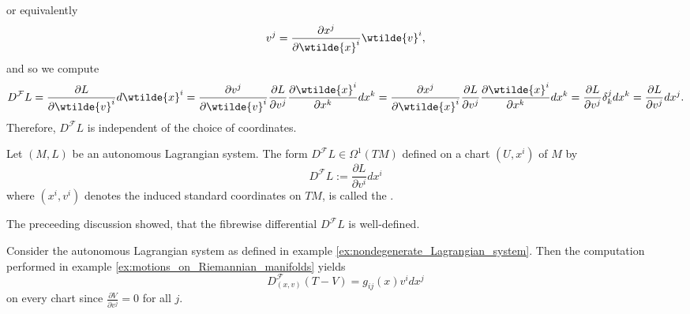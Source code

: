 \noindent or equivalently 
\begin{equation*}
	v^j = \frac{\partial x^j}{\partial \wtilde{x}^i}\wtilde{v}^i,
\end{equation*}
\noindent and so we compute
\begin{equation*}
	D^\mathcal{F}L = \frac{\partial L}{\partial \wtilde{v}^i}d\wtilde{x}^i = \frac{\partial v^j}{\partial \wtilde{v}^i}\frac{\partial L}{\partial v^j}\frac{\partial \wtilde{x}^i}{\partial x^k} dx^k = \frac{\partial x^j}{\partial \wtilde{x}^i}\frac{\partial L}{\partial v^j}\frac{\partial \wtilde{x}^i}{\partial x^k} dx^k = \frac{\partial L}{\partial v^j}\delta^j_k dx^k = \frac{\partial L}{\partial v^j}dx^j.
\end{equation*}
Therefore, $D^\mathcal{F}L$ is independent of the choice of coordinates.

\begin{definition}
	\label{def:fibrewise_differential}
	Let $(M,L)$ be an autonomous Lagrangian system. The form $D^\mathcal{F}L \in \Omega^1(TM)$ defined on a chart $(U,x^i)$ of $M$ by
	\begin{equation}
		\label{eq:fibrewise_differential}
		D^\mathcal{F}L := \frac{\partial L}{\partial v^i}dx^i
	\end{equation}
	\noindent where $(x^i,v^i)$ denotes the induced standard coordinates on $TM$, is called the .
\end{definition}

\begin{remark}
	The preceeding discussion showed, that the fibrewise differential $D^\mathcal{F}L$ is well-defined.
\end{remark}

\begin{example}
	\label{ex:fibrewise_differential_Riemannian_manifold}
	Consider the autonomous Lagrangian system as defined in example \ref{ex:nondegenerate_Lagrangian_system}. Then the computation performed in example \ref{ex:motions_on_Riemannian_manifolds} yields
	\begin{equation*}
		D_{(x,v)}^\mathcal{F}(T - V) = g_{ij}(x)v^idx^j
	\end{equation*}
	\noindent on every chart since $\frac{\partial V}{\partial v^j} = 0$ for all $j$.
\end{example}

